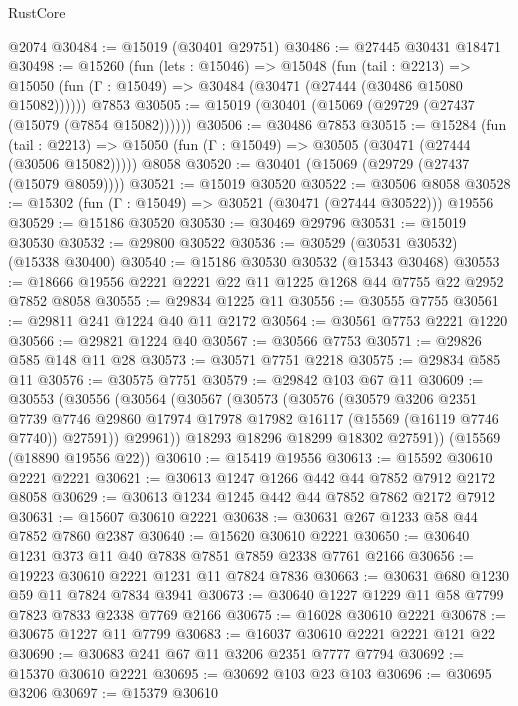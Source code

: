 \begin{lexlean}{RustCore}
\begin{coremodule}
    @2074
@30484 := @15019 (@30401 @29751)
@30486 := @27445 @30431 @18471
@30498 := @15260
    (fun (lets : @15046) =>
    @15048
      (fun (tail : @2213) =>
      @15050 (fun (Γ : @15049) => @30484 (@30471 (@27444 (@30486 @15080 @15082))))))
    @7853
@30505 := @15019 (@30401 (@15069 (@29729 (@27437 (@15079 (@7854 @15082))))))
@30506 := @30486 @7853
@30515 := @15284
    (fun (tail : @2213) => @15050 (fun (Γ : @15049) => @30505 (@30471 (@27444 (@30506 @15082)))))
    @8058
@30520 := @30401 (@15069 (@29729 (@27437 (@15079 @8059))))
@30521 := @15019 @30520
@30522 := @30506 @8058
@30528 := @15302 (fun (Γ : @15049) => @30521 (@30471 (@27444 @30522))) @19556
@30529 := @15186 @30520
@30530 := @30469 @29796
@30531 := @15019 @30530
@30532 := @29800 @30522
@30536 := @30529 (@30531 @30532) (@15338 @30400)
@30540 := @15186 @30530 @30532 (@15343 @30468)
@30553 := @18666 @19556 @2221 @2221 @22 @11 @1225 @1268 @44 @7755 @22 @2952 @7852 @8058
@30555 := @29834 @1225 @11
@30556 := @30555 @7755
@30561 := @29811 @241 @1224 @40 @11 @2172
@30564 := @30561 @7753 @2221 @1220
@30566 := @29821 @1224 @40
@30567 := @30566 @7753
@30571 := @29826 @585 @148 @11 @28
@30573 := @30571 @7751 @2218
@30575 := @29834 @585 @11
@30576 := @30575 @7751
@30579 := @29842 @103 @67 @11
@30609 := @30553
    (@30556
      (@30564
        (@30567
          (@30573
            (@30576
              (@30579
                @3206
                @2351
                @7739
                @7746
                @29860
                @17974
                @17978
                @17982
                @16117
                (@15569 (@16119 @7746 @7740))
                @27591))
            @29961))
        @18293
        @18296
        @18299
        @18302
        @27591))
    (@15569 (@18890 @19556 @22))
@30610 := @15419 @19556
@30613 := @15592 @30610 @2221 @2221
@30621 := @30613 @1247 @1266 @442 @44 @7852 @7912 @2172 @8058
@30629 := @30613 @1234 @1245 @442 @44 @7852 @7862 @2172 @7912
@30631 := @15607 @30610 @2221
@30638 := @30631 @267 @1233 @58 @44 @7852 @7860 @2387
@30640 := @15620 @30610 @2221
@30650 := @30640 @1231 @373 @11 @40 @7838 @7851 @7859 @2338 @7761 @2166
@30656 := @19223 @30610 @2221 @1231 @11 @7824 @7836
@30663 := @30631 @680 @1230 @59 @11 @7824 @7834 @3941
@30673 := @30640 @1227 @1229 @11 @58 @7799 @7823 @7833 @2338 @7769 @2166
@30675 := @16028 @30610 @2221
@30678 := @30675 @1227 @11 @7799
@30683 := @16037 @30610 @2221 @2221 @121 @22
@30690 := @30683 @241 @67 @11 @3206 @2351 @7777 @7794
@30692 := @15370 @30610 @2221
@30695 := @30692 @103 @23 @103
@30696 := @30695 @3206
@30697 := @15379 @30610

\end{coremodule}
\end{lexlean}
